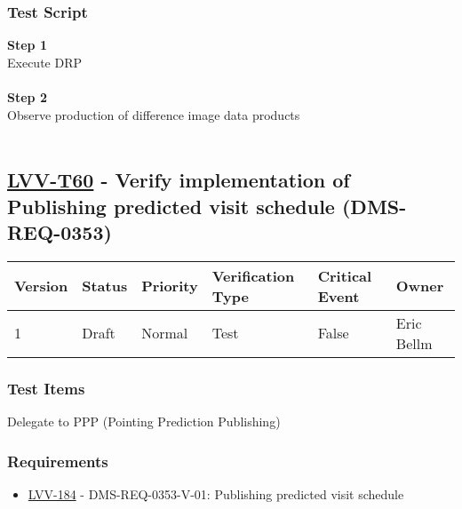 \hypertarget{test-script-36}{%
\subsubsection{Test Script}\label{test-script-36}}

\textbf{Step 1}\\
Execute DRP\\
~\\
\textbf{Step 2}\\
Observe production of difference image data products\\
~\\

\hypertarget{lvv-t60---verify-implementation-of-publishing-predicted-visit-schedule-dms-req-0353}{%
\subsection{\texorpdfstring{\href{https://jira.lsstcorp.org/secure/Tests.jspa\#/testCase/LVV-T60}{LVV-T60}
- Verify implementation of Publishing predicted visit schedule
(DMS-REQ-0353)}{LVV-T60 - Verify implementation of Publishing predicted visit schedule (DMS-REQ-0353)}}\label{lvv-t60---verify-implementation-of-publishing-predicted-visit-schedule-dms-req-0353}}

\begin{longtable}[]{@{}llllll@{}}
\toprule
Version & Status & Priority & Verification Type & Critical Event &
Owner\tabularnewline
\midrule
\endhead
1 & Draft & Normal & Test & False & Eric Bellm\tabularnewline
\bottomrule
\end{longtable}

\hypertarget{test-items-36}{%
\subsubsection{Test Items}\label{test-items-36}}

Delegate to PPP (Pointing Prediction Publishing)

\hypertarget{requirements-37}{%
\subsubsection{Requirements}\label{requirements-37}}

\begin{itemize}
\tightlist
\item
  \href{https://jira.lsstcorp.org/browse/LVV-184}{LVV-184} -
  DMS-REQ-0353-V-01: Publishing predicted visit schedule
\end{itemize}

